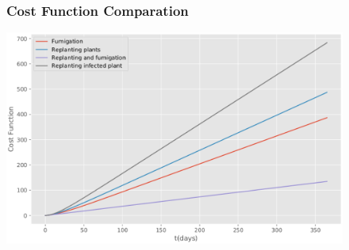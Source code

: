 \begin{frame}[plain]
	\begin{figure}
		\frametitle{Cost Function Comparation}
		\centering	
		\includegraphics[width=\linewidth]{Feathergraphics/Cost_Comparation_version_2.eps}
	\end{figure}	
\end{frame}